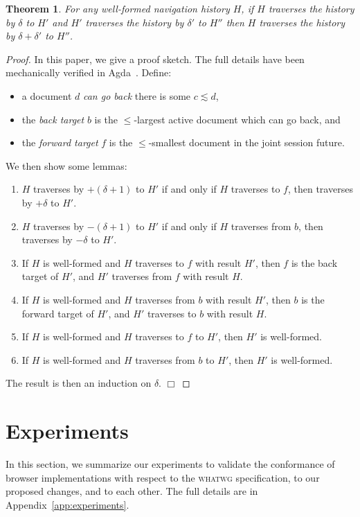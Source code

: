 \documentclass{notes}
\newcommand{\ltSess}{\lesssim}
\newtheorem{theorem}{Theorem}
\newcommand{\QED}{\hfill$\Box$}
\begin{document}
\begin{theorem}
\label{thm:fundamental}
  For any well-formed navigation history $H$,
  if $H$ traverses the history by $\delta$ to $H'$
  and $H'$ traverses the history by $\delta'$ to $H''$
  then $H$ traverses the history by $\delta+\delta'$ to $H''$.
\end{theorem}
\begin{proof}
  In this paper, we give a proof sketch. The full details have been mechanically verified in Agda~\cite{AgdaProofs}.
  Define:
  \begin{itemize}
  \item a document $d$ \emph{can go back} there is some $c \ltSess d$,
  \item the \emph{back target} $b$ is the $\le$-largest active document which can go back, and
  \item the \emph{forward target} $f$ is the $\le$-smallest document in the joint session future.
  \end{itemize}
  We then show some lemmas: 
  \begin{enumerate}
  \item $H$ traverses by $+(\delta+1)$ to $H'$ if and only if
    $H$ traverses to $f$, then traverses by $+\delta$ to $H'$.
  \item $H$ traverses by $-(\delta+1)$ to $H'$ if and only if
    $H$ traverses from $b$, then traverses by $-\delta$ to $H'$.
  \item If $H$ is well-formed and $H$ traverses to $f$ with result $H'$,
    then $f$ is the back target of $H'$, and $H'$ traverses from $f$ with result $H$.
  \item If $H$ is well-formed and $H$ traverses from $b$ with result $H'$,
    then $b$ is the forward target of $H'$, and $H'$ traverses to $b$ with result $H$.
  \item If $H$ is well-formed and $H$ traverses to $f$ to $H'$, then $H'$ is well-formed.
  \item If $H$ is well-formed and $H$ traverses from $b$ to $H'$, then $H'$ is well-formed.
  \end{enumerate}
  The result is then an induction on $\delta$.
  \QED
\end{proof}

\section{Experiments}
\label{sec:experiments}

In this section, we summarize our experiments to validate the conformance of browser
implementations with respect to the \textsc{whatwg} specification, to our proposed
changes, and to each other. The full details are in Appendix~\ref{app:experiments}.
\end{document}
